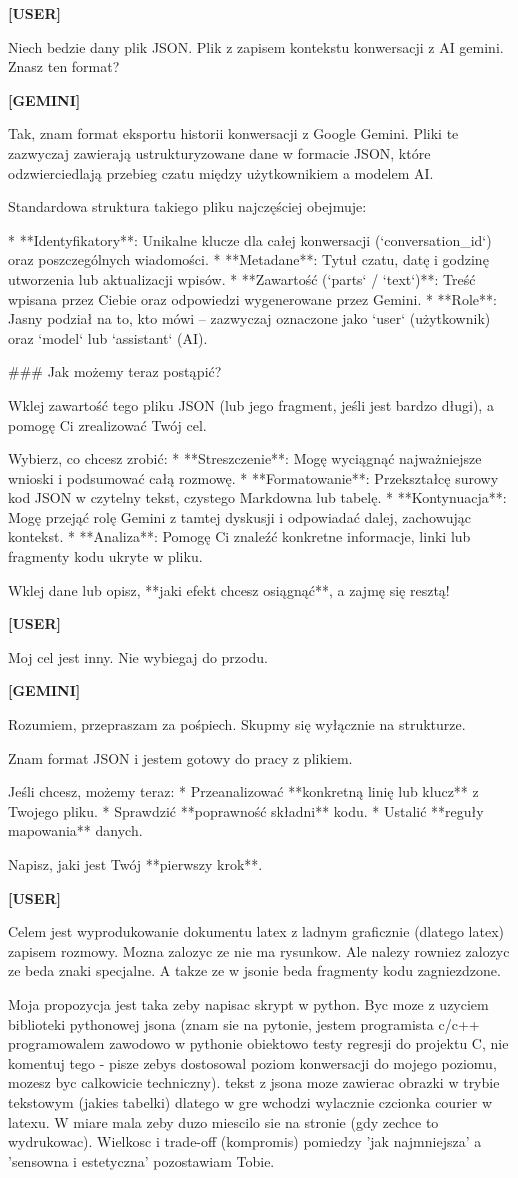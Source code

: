 \documentclass[10pt,a4paper]{article}
\newcommand{\UserTurn}{\textbf{[USER]}\par\medskip}
\newcommand{\ModelTurn}{\textbf{[GEMINI]}\par\medskip}
\newcommand{\Separator}{\par\vspace{4pt}\noindent{\color{rulecolor}\rule{\linewidth}{0.4pt}}\par\vspace{6pt}}
\begin{document}
\UserTurn
Niech bedzie dany plik JSON. Plik z zapisem kontekstu konwersacji z AI gemini. Znasz ten format?
\Separator
\ModelTurn
Tak, znam format eksportu historii konwersacji z Google Gemini. Pliki te zazwyczaj zawierają ustrukturyzowane dane w formacie JSON, które odzwierciedlają przebieg czatu między użytkownikiem a modelem AI.

Standardowa struktura takiego pliku najczęściej obejmuje:

*   **Identyfikatory**: Unikalne klucze dla całej konwersacji (`conversation\_id`) oraz poszczególnych wiadomości.
*   **Metadane**: Tytuł czatu, datę i godzinę utworzenia lub aktualizacji wpisów.
*   **Zawartość (`parts` / `text`)**: Treść wpisana przez Ciebie oraz odpowiedzi wygenerowane przez Gemini.
*   **Role**: Jasny podział na to, kto mówi – zazwyczaj oznaczone jako `user` (użytkownik) oraz `model` lub `assistant` (AI).

\#\#\# Jak możemy teraz postąpić?

Wklej zawartość tego pliku JSON (lub jego fragment, jeśli jest bardzo długi), a pomogę Ci zrealizować Twój cel.

Wybierz, co chcesz zrobić:
*   **Streszczenie**: Mogę wyciągnąć najważniejsze wnioski i podsumować całą rozmowę.
*   **Formatowanie**: Przekształcę surowy kod JSON w czytelny tekst, czystego Markdowna lub tabelę.
*   **Kontynuacja**: Mogę przejąć rolę Gemini z tamtej dyskusji i odpowiadać dalej, zachowując kontekst.
*   **Analiza**: Pomogę Ci znaleźć konkretne informacje, linki lub fragmenty kodu ukryte w pliku.

Wklej dane lub opisz, **jaki efekt chcesz osiągnąć**, a zajmę się resztą!
\Separator
\UserTurn
Moj cel jest inny. Nie wybiegaj do przodu.
\Separator
\ModelTurn
Rozumiem, przepraszam za pośpiech. Skupmy się wyłącznie na strukturze.

Znam format JSON i jestem gotowy do pracy z plikiem.

Jeśli chcesz, możemy teraz:
* Przeanalizować **konkretną linię lub klucz** z Twojego pliku.
* Sprawdzić **poprawność składni** kodu.
* Ustalić **reguły mapowania** danych.

Napisz, jaki jest Twój **pierwszy krok**.
\Separator
\UserTurn
Celem jest wyprodukowanie dokumentu latex z ladnym graficznie (dlatego latex) zapisem rozmowy. Mozna zalozyc ze nie ma rysunkow. Ale nalezy rowniez zalozyc ze beda znaki specjalne. A takze ze w jsonie beda fragmenty kodu zagniezdzone.

Moja propozycja jest taka zeby napisac skrypt w python. Byc moze z uzyciem biblioteki pythonowej jsona (znam sie na pytonie, jestem programista c/c++ programowalem zawodowo w pythonie obiektowo testy regresji do projektu C, nie komentuj tego - pisze zebys dostosowal poziom konwersacji do mojego poziomu, mozesz byc calkowicie techniczny). tekst z jsona moze zawierac obrazki w trybie tekstowym (jakies tabelki) dlatego w gre wchodzi wylacznie czcionka courier w latexu. W miare mala zeby duzo miescilo sie na stronie (gdy zechce to wydrukowac). Wielkosc i trade-off (kompromis) pomiedzy 'jak najmniejsza' a 'sensowna i estetyczna' pozostawiam Tobie.
\end{document}
